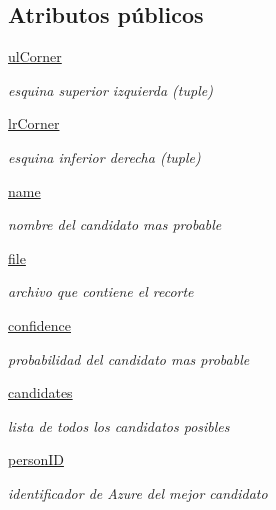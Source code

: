 \subsection*{Atributos públicos}
\begin{DoxyCompactItemize}
\item 
\mbox{\hyperlink{class_f_c_module_1_1face_1_1_face_a23e2d922b8ff5921a8c776d0a2f2f61a}{ul\+Corner}}
\begin{DoxyCompactList}\small\item\em esquina superior izquierda (tuple) \end{DoxyCompactList}\item 
\mbox{\hyperlink{class_f_c_module_1_1face_1_1_face_a43bf5b7efff377dfe7d6a3e25a58c0cc}{lr\+Corner}}
\begin{DoxyCompactList}\small\item\em esquina inferior derecha (tuple) \end{DoxyCompactList}\item 
\mbox{\hyperlink{class_f_c_module_1_1face_1_1_face_ac6d9689048431c7a6ee57dd4427bf1fd}{name}}
\begin{DoxyCompactList}\small\item\em nombre del candidato mas probable \end{DoxyCompactList}\item 
\mbox{\hyperlink{class_f_c_module_1_1face_1_1_face_a40c9a64c12394c21bb6378bc13a92602}{file}}
\begin{DoxyCompactList}\small\item\em archivo que contiene el recorte \end{DoxyCompactList}\item 
\mbox{\hyperlink{class_f_c_module_1_1face_1_1_face_af180bf0699bdb16fba163a1123ecb057}{confidence}}
\begin{DoxyCompactList}\small\item\em probabilidad del candidato mas probable \end{DoxyCompactList}\item 
\mbox{\hyperlink{class_f_c_module_1_1face_1_1_face_a6b34b10a30cab4dcf7a6117061080c59}{candidates}}
\begin{DoxyCompactList}\small\item\em lista de todos los candidatos posibles \end{DoxyCompactList}\item 
\mbox{\hyperlink{class_f_c_module_1_1face_1_1_face_a9eb1f17f0ed52af706762346be0f9a52}{person\+ID}}
\begin{DoxyCompactList}\small\item\em identificador de Azure del mejor candidato \end{DoxyCompactList}\end{DoxyCompactItemize}


